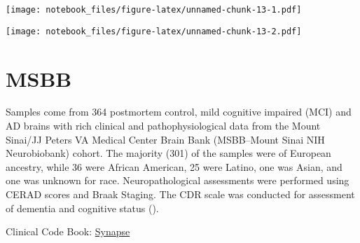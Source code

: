 \documentclass[]{book}
\newenvironment{Shaded}{\begin{snugshade}}{\end{snugshade}}
\newcommand{\DataTypeTok}[1]{\textcolor[rgb]{0.13,0.29,0.53}{#1}}
\newcommand{\KeywordTok}[1]{\textcolor[rgb]{0.13,0.29,0.53}{\textbf{#1}}}
\newcommand{\NormalTok}[1]{#1}
\newcommand{\OperatorTok}[1]{\textcolor[rgb]{0.81,0.36,0.00}{\textbf{#1}}}
\newcommand{\StringTok}[1]{\textcolor[rgb]{0.31,0.60,0.02}{#1}}
\begin{document}
\texttt{[image: notebook\_files/figure-latex/unnamed-chunk-13-1.pdf]}

\begin{Shaded}
\end{Shaded}

\texttt{[image: notebook\_files/figure-latex/unnamed-chunk-13-2.pdf]}

\hypertarget{msbb}{%
\chapter{MSBB}\label{msbb}}

Samples come from 364 postmortem control, mild cognitive impaired (MCI) and AD brains with rich clinical and pathophysiological data from the Mount Sinai/JJ Peters VA Medical Center Brain Bank (MSBB--Mount Sinai NIH Neurobiobank) cohort. The majority (301) of the samples were of European ancestry, while 36 were African American, 25 were Latino, one was Asian, and one was unknown for race. Neuropathological assessments were performed using CERAD scores and Braak Staging. The CDR scale was conducted for assessment of dementia and cognitive status (\citet{10.1038/sdata.2018.185}).

Clinical Code Book: \href{https://adknowledgeportal.synapse.org/Explore/Studies?Study=syn3159438}{Synapse}
\end{document}
